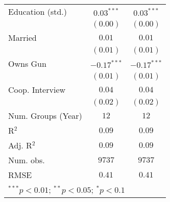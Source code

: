 \begin{table}
\begin{center}
\begin{tabular}{l c c}
Education (std.)        & $0.03^{***}$  & $0.03^{***}$  \\
                        & $(0.00)$      & $(0.00)$      \\
Married                 & $0.01$        & $0.01$        \\
                        & $(0.01)$      & $(0.01)$      \\
Owns Gun                & $-0.17^{***}$ & $-0.17^{***}$ \\
                        & $(0.01)$      & $(0.01)$      \\
Coop. Interview         & $0.04$        & $0.04$        \\
                        & $(0.02)$      & $(0.02)$      \\
\midrule
Num. Groups (Year)      & $12$          & $12$          \\
R$^2$                   & $0.09$        & $0.09$        \\
Adj. R$^2$              & $0.09$        & $0.09$        \\
Num. obs.               & $9737$        & $9737$        \\
RMSE                    & $0.41$        & $0.41$        \\
\bottomrule
\multicolumn{3}{l}{\scriptsize{$^{***}p<0.01$; $^{**}p<0.05$; $^{*}p<0.1$}}
\end{tabular}
\label{table_ate_alt_treat}
\end{center}
\end{table}
